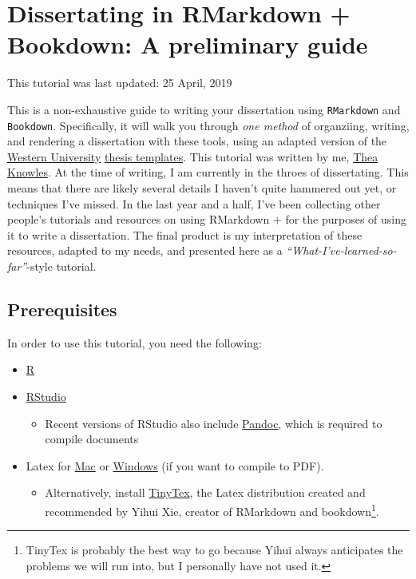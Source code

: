 \documentclass[
  12pt,
  oneside]{book}
\providecommand{\tightlist}{%
  \setlength{\itemsep}{0pt}\setlength{\parskip}{0pt}}
\numberwithin{figure}{chapter}
\begin{document}
\mainmatter
\hypertarget{dissertating-in-rmarkdown-bookdown-a-preliminary-guide}{%
\chapter{Dissertating in RMarkdown + Bookdown: A preliminary guide}\label{dissertating-in-rmarkdown-bookdown-a-preliminary-guide}}

This tutorial was last updated: 25 April, 2019

This is a non-exhaustive guide to writing your dissertation using \texttt{RMarkdown} and \texttt{Bookdown}.
Specifically, it will walk you through \emph{one method} of organziing, writing, and rendering a dissertation with these tools, using an adapted version of the \href{uwo.ca}{Western University} \href{https://grad.uwo.ca/academics/thesis/formatting.html}{thesis templates}.
This tutorial was written by me, \href{theaknowles.com}{Thea Knowles}. At the time of writing, I am currently in the throes of dissertating. This means that there are likely several details I haven't quite hammered out yet, or techniques I've missed. In the last year and a half, I've been collecting other people's tutorials and resources on using RMarkdown + for the purposes of using it to write a dissertation. The final product is my interpretation of these resources, adapted to my needs, and presented here as a \emph{``What-I've-learned-so-far''}-style tutorial.

\hypertarget{prerequisites}{%
\section{Prerequisites}\label{prerequisites}}

In order to use this tutorial, you need the following:

\begin{itemize}
\tightlist
\item
  \href{https://www.r-project.org/}{R}
\item
  \href{https://www.rstudio.com/products/rstudio/download/}{RStudio}

  \begin{itemize}
  \tightlist
  \item
    Recent versions of RStudio also include \href{}{Pandoc}, which is required to compile documents
  \end{itemize}
\item
  Latex for \href{https://tug.org/mactex/mactex-download.html}{Mac} or \href{https://miktex.org/download}{Windows} (if you want to compile to PDF).

  \begin{itemize}
  \tightlist
  \item
    Alternatively, install \href{https://yihui.name/tinytex/}{TinyTex}, the Latex distribution created and recommended by Yihui Xie, creator of RMarkdown and bookdown\footnote{TinyTex is probably the best way to go because Yihui always anticipates the problems we will run into, but I personally have not used it.}.
  \end{itemize}
\end{itemize}
\end{document}
